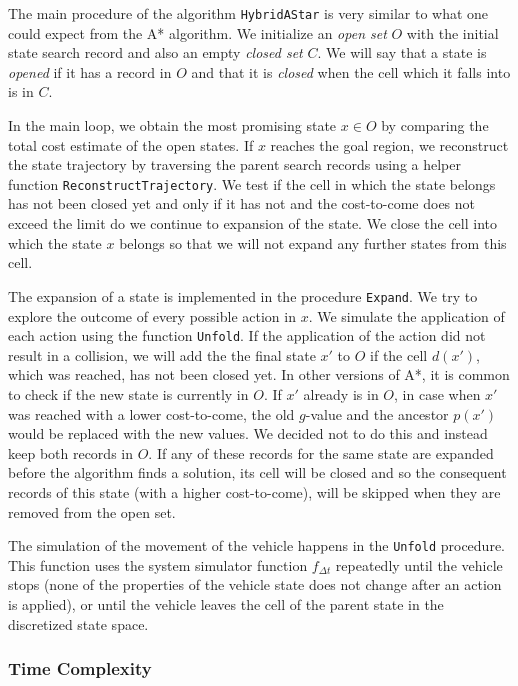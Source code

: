 The main procedure of the algorithm \texttt{HybridAStar} is very similar to what one could expect from the A* algorithm. We initialize an \textit{open set} $O$ with the initial state search record and also an empty \textit{closed set} $C$. We will say that a state is \textit{opened} if it has a record in $O$ and that it is \textit{closed} when the cell which it falls into is in $C$.

In the main loop, we obtain the most promising state $x\in O$ by comparing the total cost estimate of the open states. If $x$ reaches the goal region, we reconstruct the state trajectory by traversing the parent search records using a helper function \texttt{ReconstructTrajectory}. We test if the cell in which the state belongs has not been closed yet and only if it has not and the cost-to-come does not exceed the limit do we continue to expansion of the state. We close the cell into which the state $x$ belongs so that we will not expand any further states from this cell.

The expansion of a state is implemented in the procedure \texttt{Expand}. We try to explore the outcome of every possible action in $x$. We simulate the application of each action using the function \texttt{Unfold}. If the application of the action did not result in a collision, we will add the the final state $x'$ to $O$ if the cell $d(x')$, which was reached, has not been closed yet. In other versions of A*, it is common to check if the new state is currently in $O$. If $x'$ already is in $O$, in case when $x'$ was reached with a lower cost-to-come, the old $g$-value and the ancestor $p(x')$ would be replaced with the new values. We decided not to do this and instead keep both records in $O$. If any of these records for the same state are expanded before the algorithm finds a solution, its cell will be closed and so the consequent records of this state (with a higher cost-to-come), will be skipped when they are removed from the open set.

The simulation of the movement of the vehicle happens in the \texttt{Unfold} procedure. This function uses the system simulator function $f_{\Delta t}$ repeatedly until the vehicle stops (none of the properties of the vehicle state does not change after an action is applied), or until the vehicle leaves the cell of the parent state in the discretized state space.

\subsubsection{Time Complexity}

